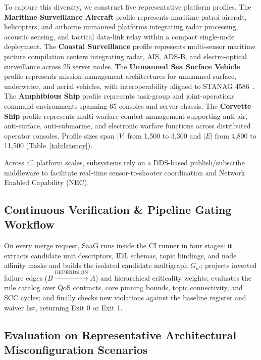 \documentclass[sigconf,9pt]{acmart}
\begin{document}
To capture this diversity, we construct five representative platform profiles. The \textbf{Maritime Surveillance Aircraft} profile represents maritime patrol aircraft, helicopters, and airborne unmanned platforms integrating radar processing, acoustic sensing, and tactical data-link relay within a compact single-node deployment. The \textbf{Coastal Surveillance} profile represents multi-sensor maritime picture compilation centers integrating radar, AIS, ADS-B, and electro-optical surveillance across 25 server nodes. The \textbf{Unmanned Sea Surface Vehicle} profile represents mission-management architectures for unmanned surface, underwater, and aerial vehicles, with interoperability aligned to STANAG 4586~\cite{stanag4586}. The \textbf{Amphibious Ship} profile represents task-group and joint-operations command environments spanning 65 consoles and server chassis. The \textbf{Corvette Ship} profile represents multi-warfare combat management supporting anti-air, anti-surface, anti-submarine, and electronic warfare functions across distributed operator consoles. Profile sizes span $|V|$ from 1{,}500 to 3{,}300 and $|E|$ from 4{,}800 to 11{,}500 (Table~\ref{tab:latency}).

Across all platform scales, subsystems rely on a DDS-based publish/subscribe middleware to facilitate real-time sensor-to-shooter coordination and Network Enabled Capability (NEC).

\subsection{Continuous Verification \& Pipeline Gating Workflow}

On every merge request, SaaG runs inside the CI runner in four stages: it extracts candidate unit descriptors, IDL schemas, topic bindings, and node affinity masks and builds the isolated candidate multigraph $G_{u'}$; projects inverted failure edges ($B \xrightarrow{\text{DEPENDS\_ON}} A$) and hierarchical criticality weights; evaluates the rule catalog over QoS contracts, core pinning bounds, topic connectivity, and SCC cycles; and finally checks new violations against the baseline register and waiver list, returning Exit 0 or Exit 1.

\subsection{Evaluation on Representative Architectural Misconfiguration Scenarios}
\end{document}

